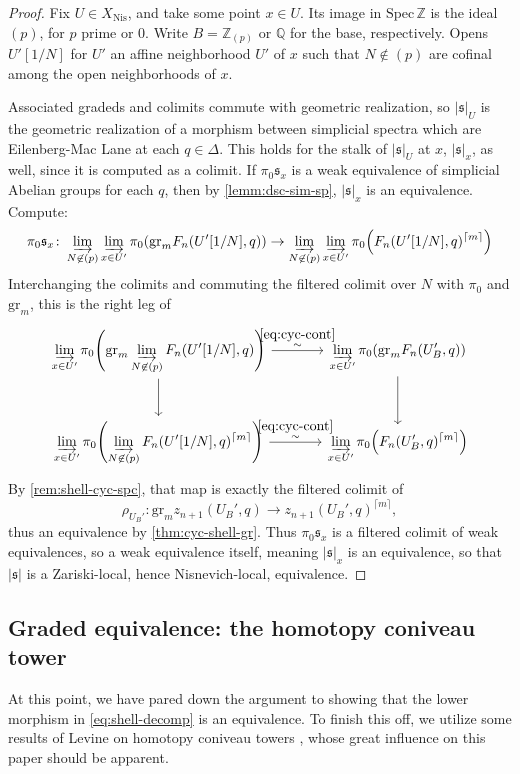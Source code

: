 \documentclass[11pt, twoside]{article}
\numberwithin{equation}{section}
\theoremstyle{definition}
\newcommand{\bb}[1]{\mathbb{#1}}
\newcommand{\colim}{\varinjlim}
\newcommand{\spec}{\mathrm{Spec} \,}
\newcommand{\mf}[1]{\mathfrak{#1}}
\newcommand{\gr}{\mathrm{gr}}
\newcommand{\nis}{\mathrm{Nis}}
\begin{document}
\begin{proof}
Fix \(U \in X_\nis\), and take some point \(x \in U\). Its image in \(\spec \bb{Z}\) is the ideal \((p)\), for \(p\) prime or 0. Write \(B = \bb{Z}_{(p)}\) or \(\bb{Q}\) for the base, respectively. Opens \(U'[1/N]\) for \(U'\) an affine neighborhood \(U'\) of \(x\) such that \(N \not \in (p)\) are cofinal among the open neighborhoods of \(x\).

Associated gradeds and colimits commute with geometric realization, so \(|\mf{s}|_U\) is the geometric realization of a morphism between simplicial spectra which are Eilenberg-Mac Lane at each \(q \in \Delta\). This holds for the stalk of \(|\mf{s}|_U\) at \(x\), \(|\mf{s}|_x\), as well, since it is computed as a colimit. If \(\pi_0 \mf{s}_x\) is a weak equivalence of simplicial Abelian groups for each \(q\), then by \ref{lemm:dsc-sim-sp}, \(|\mf{s}|_x\) is an equivalence. Compute: 
\[\pi_0 \mf{s}_x \colon \colim_{N \not \in (p)} \colim_{x \in U'} \pi_0 \! \left(\gr_m F_n(U'[1/N], q)\right) \to \colim_{N \not \in (p)} \colim_{x \in U'} \pi_0 \! \left(F_n(U'[1/N], q)^{\lceil m \rceil}\right)\]
Interchanging the colimits and commuting the filtered colimit over \(N\) with \(\pi_0\) and \(\gr_m\), this is the right leg of 
\[\begin{tikzcd} [row sep = large, column sep = large]
\displaystyle \colim_{x \in U'}  \pi_0 \! \left(\gr_m \displaystyle \colim_{N \not \in (p)} F_n(U'[1/N], q)\right) \ar[d] \ar[r, "\stackrel{\ref{eq:cyc-cont}} \sim"] & \displaystyle \colim_{x \in U'} \pi_0 \! \left(\gr_m F_n(U_B', q)\right) \ar[d]\\
\displaystyle \colim_{x \in U'}  \pi_0 \! \left(\displaystyle \colim_{N \not \in (p)} F_n(U'[1/N], q)^{\lceil m \rceil} \right) \ar[r, "\stackrel{\ref{eq:cyc-cont}} \sim"] & \displaystyle \colim_{x \in U'} \pi_0 \! \left(F_n(U_B', q)^{\lceil m \rceil} \right)
\end{tikzcd}\] 
By \ref{rem:shell-cyc-spc}, that map is exactly the filtered colimit of 
\[\rho_{U_B'} \colon \gr_m z_{n + 1}(U_B', q) \to z_{n + 1}(U_B', q)^{\lceil m \rceil},\]
thus an equivalence by \ref{thm:cyc-shell-gr}. Thus \(\pi_0 \mf{s}_x\) is a filtered colimit of weak equivalences, so a weak equivalence itself, meaning \(|\mf{s}|_x\) is an equivalence, so that \(|\mf{s}|\) is a Zariski-local, hence Nisnevich-local, equivalence.
\end{proof}

\subsection{Graded equivalence: the homotopy coniveau tower}
At this point, we have pared down the argument to showing that the lower morphism in \ref{eq:shell-decomp} is an equivalence. To finish this off, we utilize some results of Levine on homotopy coniveau towers \cite{LevHC}, whose great influence on this paper should be apparent.
\end{document}
